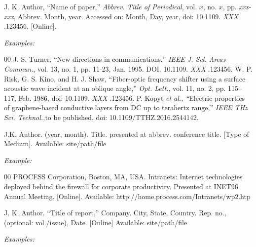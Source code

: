 \documentclass[journal,onecolumn,web]{ieeecolor}
\begin{document}

\noindent J. K. Author, ``Name of paper,'' {\it Abbrev. Title of Periodical}, vol. $x$, no. $x$, pp. {\it xxx-xxx}, Abbrev. Month, year.
Accessed on: Month, Day, year, doi:  {10.1109.} {{\it
XXX}} {.123456}, [Online].

{\it Examples:}{\vadjust{\vspace*{-2.5em}}}

\begin{thebibliography}{00}
 J. S. Turner, ``New directions in communications,'' {\it IEEE J. Sel. Areas Commun}., vol. 13, no. 1, pp. 11-23, Jan. 1995. DOI.  {10.1109.} {{\it XXX}} {.123456}.
 W. P. Risk, G. S. Kino, and H. J. Shaw, ``Fiber-optic frequency shifter using a surface acoustic wave incident at an oblique angle,'' {\it Opt. Lett.}, vol. 11, no. 2, pp. 115--117, Feb. 1986, doi: {10.1109.} {{\it XXX}} {.123456}.
 P. Kopyt {\it \textit{et al.}, ``}Electric properties of graphene-based conductive layers from DC up to terahertz range,'' {\it IEEE THz Sci. Technol.,}to be published, doi:  {10.1109/TTHZ.2016.2544142}.
\end{thebibliography}


\noindent J.K. Author. (year, month). Title. presented at abbrev. conference title.
[Type of Medium]. Available: site/path/file

{\it Example:}{\vadjust{\vspace*{-2.5em}}}

\begin{thebibliography}{00}
 PROCESS Corporation, Boston, MA, USA. Intranets: Internet technologies deployed behind the firewall for corporate productivity. Presented at INET96 Annual Meeting. [Online]. Available:  {http://home.process.com/Intranets/wp2.htp}
\end{thebibliography}


\noindent J. K. Author. ``Title of report,'' Company. City, State, Country. Rep. no.,
(optional: vol./issue), Date. [Online] Available:
{site/path/file}

{\it Examples:}{\vadjust{\vspace*{-2.5em}}}
\end{document}
